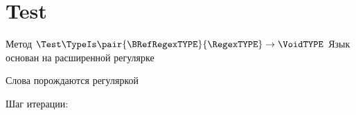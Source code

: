\section{Test}
\begin{frame}{Метод $\Test\TypeIs\pair{\BRefRegexTYPE}{\RegexTYPE}\to\VoidTYPE$}
    Язык основан на расширенной регулярке

    Слова порождаются регуляркой 

    Шаг итерации:



\end{frame}
